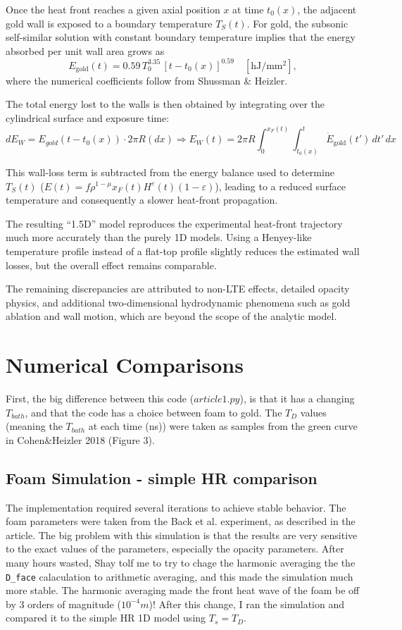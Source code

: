 \documentclass{article}
\begin{document}
Once the heat front reaches a given axial position $x$ at time $t_0(x)$,
the adjacent gold wall is exposed to a boundary temperature $T_S(t)$.
For gold, the subsonic self-similar solution with constant boundary temperature
implies that the energy absorbed per unit wall area grows as
\[
E_{\mathrm{gold}}(t)
= 0.59\, T_0^{3.35}\, [t - t_0(x)]^{0.59}
\quad [\mathrm{hJ/mm^2}],
\]
where the numerical coefficients follow from Shussman \& Heizler.

The total energy lost to the walls is then obtained by integrating
over the cylindrical surface and exposure time:
\[ dE_W = E_{gold}(t-t_0(x))\cdot 2\pi R(dx) \Rightarrow
E_W(t)
= 2\pi R
\int_0^{x_F(t)}
\int_{t_0(x)}^{t}
\dot{E}_{\mathrm{gold}}(t')\,dt'\,dx
\]

This wall-loss term is subtracted from the energy balance used
to determine $T_S(t)$ ($E(t) = f \rho^{1-\mu} x_F(t) H^{\varepsilon}(t)(1-\varepsilon)$),
leading to a reduced surface temperature
and consequently a slower heat-front propagation.

The resulting ``1.5D'' model reproduces the experimental heat-front trajectory
much more accurately than the purely 1D models.
Using a Henyey-like temperature profile instead of a flat-top profile
slightly reduces the estimated wall losses,
but the overall effect remains comparable.

The remaining discrepancies are attributed to
non-LTE effects, detailed opacity physics,
and additional two-dimensional hydrodynamic phenomena
such as gold ablation and wall motion,
which are beyond the scope of the analytic model.

\section{Numerical Comparisons}
First, the big difference between this code ($article1.py$), is that it has a changing $T_{bath}$, and that the code has a choice between foam to gold. The $T_D$ values (meaning the $T_{bath}$ at each time (ns)) were taken as samples from the green curve in Cohen\&Heizler 2018 (Figure 3).
\subsection{Foam Simulation - simple HR comparison}
The implementation required several iterations to achieve stable behavior. The foam parameters were taken from the Back et al. experiment, as described in the article. The big problem with this simulation is that the results are very sensitive to the exact values of the parameters, especially the opacity parameters. After many hours wasted, Shay tolf me to try to chage the harmonic averaging the the \texttt{D\_face} calaculation to arithmetic averaging, and this made the simulation much more stable. The harmonic averaging made the front heat wave of the foam be off by 3 orders of magnitude ($10^{-4}m$)! After this change, I ran the simulation and compared it to the simple HR 1D model using $T_s=T_D$.
\end{document}

